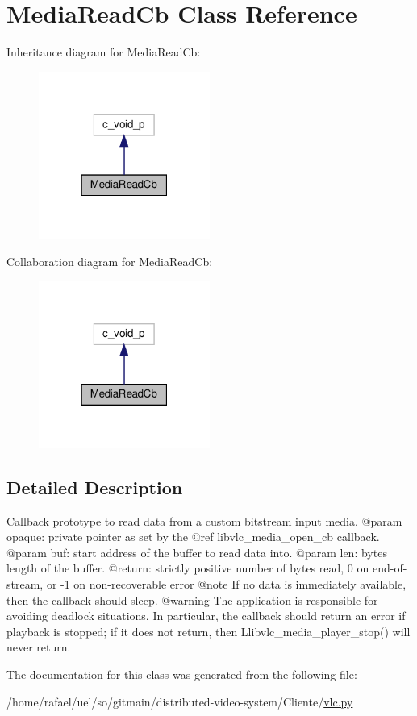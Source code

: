 \hypertarget{classvlc_1_1_media_read_cb}{}\section{Media\+Read\+Cb Class Reference}
\label{classvlc_1_1_media_read_cb}


Inheritance diagram for Media\+Read\+Cb\+:
\nopagebreak
\begin{figure}[H]
\begin{center}
\leavevmode
\includegraphics[width=159pt]{classvlc_1_1_media_read_cb__inherit__graph}
\end{center}
\end{figure}


Collaboration diagram for Media\+Read\+Cb\+:
\nopagebreak
\begin{figure}[H]
\begin{center}
\leavevmode
\includegraphics[width=159pt]{classvlc_1_1_media_read_cb__coll__graph}
\end{center}
\end{figure}


\subsection{Detailed Description}
\begin{DoxyVerb}Callback prototype to read data from a custom bitstream input media.
@param opaque: private pointer as set by the @ref libvlc_media_open_cb callback.
@param buf: start address of the buffer to read data into.
@param len: bytes length of the buffer.
@return: strictly positive number of bytes read, 0 on end-of-stream, or -1 on non-recoverable error @note If no data is immediately available, then the callback should sleep. @warning The application is responsible for avoiding deadlock situations. In particular, the callback should return an error if playback is stopped; if it does not return, then L{libvlc_media_player_stop}() will never return.
\end{DoxyVerb}
 

The documentation for this class was generated from the following file\+:\begin{DoxyCompactItemize}
\item 
/home/rafael/uel/so/gitmain/distributed-\/video-\/system/\+Cliente/\hyperlink{vlc_8py}{vlc.\+py}\end{DoxyCompactItemize}
